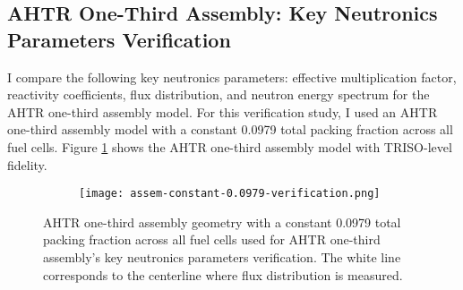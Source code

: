\subsection{AHTR One-Third Assembly: Key Neutronics Parameters Verification}
I compare the following key neutronics parameters: effective multiplication factor, 
reactivity coefficients, flux distribution, and neutron energy spectrum for the 
\gls{AHTR} one-third assembly model. 
For this verification study, I used an \gls{AHTR} one-third assembly model with a 
constant 0.0979 total packing fraction across all fuel cells.  
Figure \ref{fig:ahtr-assem-verification} shows the \gls{AHTR} one-third assembly 
model with TRISO-level fidelity.
\begin{figure}[htbp]
    \centering
    \begin{subfigure}{.7\textwidth}
    \texttt{[image: assem-constant-0.0979-verification.png]}
    \end{subfigure}%
    \begin{subfigure}{.3\textwidth}
        \vspace{1cm}
    \end{subfigure}
    \caption{\acrfull{AHTR} one-third assembly geometry with a constant 0.0979 total packing 
    fraction across all fuel cells used for \gls{AHTR} one-third assembly's key neutronics 
    parameters verification. 
    The white line corresponds to the centerline where flux distribution is measured. }  
    \label{fig:ahtr-assem-verification}
\end{figure}

